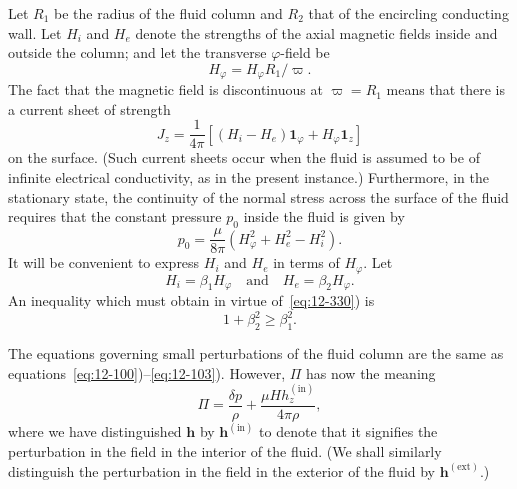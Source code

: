 Let $R_1$ be the radius of the fluid column and $R_2$ that of the encircling conducting wall. Let $H_i$ and $H_e$ denote the strengths of the axial magnetic fields inside and outside the column; and let the transverse $\varphi$-field be
\begin{equation}
\label{eq:12-328}
H_\varphi = H_\varphi R_1/\varpi.
\end{equation}
The fact that the magnetic field is discontinuous at $\varpi = R_1$ means that there is a current sheet of strength
\begin{equation}
\label{eq:12-329}
J_z = \frac{1}{4\pi}[(H_i - H_e)\mathbf{1}_\varphi + H_\varphi\mathbf{1}_z]
\end{equation}
on the surface. (Such current sheets occur when the fluid is assumed to be of infinite electrical conductivity, as in the present instance.) Furthermore, in the stationary state, the continuity of the normal stress across the surface of the fluid requires that the constant pressure $p_0$ inside the fluid is given by
\begin{equation}
\label{eq:12-330}
p_0 = \frac{\mu}{8\pi}(H_\varphi^2 + H_e^2 - H_i^2).
\end{equation}
It will be convenient to express $H_i$ and $H_e$ in terms of $H_\varphi$. Let
\begin{equation}
\label{eq:12-331}
H_i = \beta_1 H_\varphi \quad \text{and} \quad H_e = \beta_2 H_\varphi.
\end{equation}
An inequality which must obtain in virtue of~\eqref{eq:12-330}) is
\begin{equation}
\label{eq:12-332}
1 + \beta_2^2 \geq \beta_1^2.
\end{equation}


The equations governing small perturbations of the fluid column are the same as equations~\eqref{eq:12-100})--\eqref{eq:12-103}). However, $\Pi$ has now the meaning
\begin{equation}
\label{eq:12-333}
\Pi = \frac{\delta p}{\rho} + \frac{\mu H h_z^{(\mathrm{in})}}{4\pi\rho},
\end{equation}
where we have distinguished $\mathbf{h}$ by $\mathbf{h}^{(\mathrm{in})}$ to denote that it signifies the perturbation in the field in the interior of the fluid. (We shall similarly distinguish the perturbation in the field in the exterior of the fluid by $\mathbf{h}^{(\mathrm{ext})}$.)

